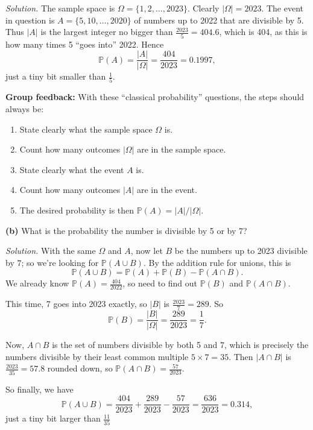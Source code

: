 \documentclass[
  a4paper,
]{book}
\providecommand{\tightlist}{%
  \setlength{\itemsep}{0pt}\setlength{\parskip}{0pt}}
\theoremstyle{definition}
\theoremstyle{definition}
\theoremstyle{definition}
\theoremstyle{definition}
\theoremstyle{remark}
\begin{document}
\begin{myanswers}

\emph{Solution.} The sample space is \(\Omega = \{1, 2, \dots, 2023\}\). Clearly \(|\Omega| = 2023\). The event in question is \(A = \{5, 10, \dots, 2020\}\) of numbers up to 2022 that are divisible by 5. Thus \(|A|\) is the largest integer no bigger than \(\frac{2023}{5} = 404.6\), which is 404, as this is how many times 5 ``goes into'' 2022. Hence
\[ \mathbb P(A) = \frac{|A|}{|\Omega|} = \frac{404}{2023} = 0.1997 , \]
just a tiny bit smaller than \(\frac{1}{5}\).

\textbf{Group feedback:} With these ``classical probability'' questions, the steps should always be:

\begin{enumerate}
\def\labelenumi{\arabic{enumi}.}
\tightlist
\item
  State clearly what the sample space \(\Omega\) is.
\item
  Count how many outcomes \(|\Omega|\) are in the sample space.
\item
  State clearly what the event \(A\) is.
\item
  Count how many outcomes \(|A|\) are in the event.
\item
  The desired probability is then \(\mathbb P(A) = |A|/|\Omega|\).
\end{enumerate}

\end{myanswers}

\textbf{(b)} What is the probability the number is divisible by 5 or by 7?

\begin{myanswers}
\emph{Solution.} With the same \(\Omega\) and \(A\), now let \(B\) be the numbers up to 2023 divisible by \(7\); so we're looking for \(\mathbb P(A \cup B)\). By the addition rule for unions, this is
\[ \mathbb P(A \cup B) = \mathbb P(A) + \mathbb P(B) - \mathbb P(A \cap B) . \]
We already know \(\mathbb P(A) = \frac{404}{2022}\), so need to find out \(\mathbb P(B)\) and \(\mathbb P(A \cap B)\).

This time, 7 goes into 2023 exactly, so \(|B|\) is \(\frac{2023}{7} = 289\). So
\[ \mathbb P(B) = \frac{|B|}{|\Omega|} = \frac{289}{2023} = \frac{1}{7}  . \]

Now, \(A \cap B\) is the set of numbers divisible by both 5 and 7, which is precisely the numbers divisible by their least common multiple \(5 \times 7 = 35\). Then \(|A \cap B|\) is \(\frac{2023}{35} = 57.8\) rounded down, so \(\mathbb P(A \cap B) = \frac{57}{2023}\).

So finally, we have
\[ \mathbb P(A \cup B) = \frac{404}{2023} + \frac{289}{2023} - \frac{57}{2023} = \frac{636}{2023} = 0.314 , \]
just a tiny bit larger than \(\frac{11}{35}\)

\end{myanswers}
\end{document}
